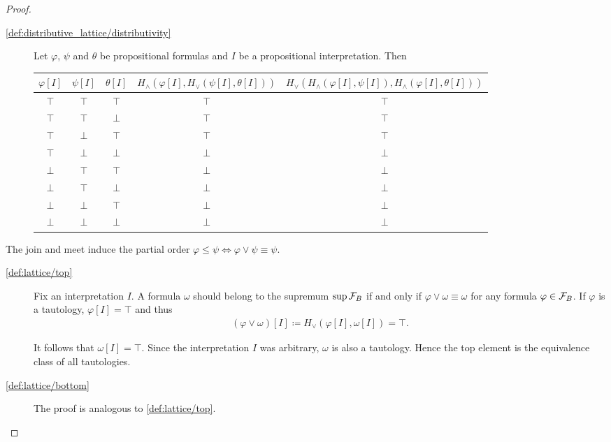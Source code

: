 \begin{proof}
\begin{description}
    \item[\ref{def:distributive_lattice/distributivity}] Let $\varphi$, $\psi$ and $\theta$ be propositional formulas and $I$ be a propositional interpretation. Then
    \begin{center}
      \begin{tabular}{c c c | c | c}
        $\varphi[I]$ & $\psi[I]$ & $\theta[I]$ & \small{$H_\land(\varphi[I], H_\lor(\psi[I], \theta[I]))$} & \small{$H_\lor(H_\land(\varphi[I], \psi[I]), H_\land(\varphi[I], \theta[I]))$} \\
        \hline
        $\top$       & $\top$    & $\top$      & $\top$                                            & $\top$ \\
        $\top$       & $\top$    & $\bot$      & $\top$                                            & $\top$ \\
        $\top$       & $\bot$    & $\top$      & $\top$                                            & $\top$ \\
        $\top$       & $\bot$    & $\bot$      & $\bot$                                            & $\bot$ \\
        $\bot$       & $\top$    & $\top$      & $\bot$                                            & $\bot$ \\
        $\bot$       & $\top$    & $\bot$      & $\bot$                                            & $\bot$ \\
        $\bot$       & $\bot$    & $\top$      & $\bot$                                            & $\bot$ \\
        $\bot$       & $\bot$    & $\bot$      & $\bot$                                            & $\bot$
      \end{tabular}
    \end{center}
  \end{description}

  The join and meet induce the partial order $\varphi \leq \psi \iff \varphi \lor \psi \equiv \psi$.

  \begin{description}
    \item[\ref{def:lattice/top}] Fix an interpretation $I$. A formula $\omega$ should belong to the supremum $\sup \mathcal F_B$ if and only if $\varphi \lor \omega \equiv \omega$ for any formula $\varphi \in \mathcal F_B$. If $\varphi$ is a tautology, $\varphi[I] = \top$ and thus
    \begin{align*}
      (\varphi \lor \omega)[I] \coloneqq H_\lor(\varphi[I], \omega[I]) = \top.
    \end{align*}

    It follows that $\omega[I] = \top$. Since the interpretation $I$ was arbitrary, $\omega$ is also a tautology. Hence the top element is the equivalence class of all tautologies.

    \item[\ref{def:lattice/bottom}] The proof is analogous to \ref{def:lattice/top}.
  \end{description}
\end{proof}
